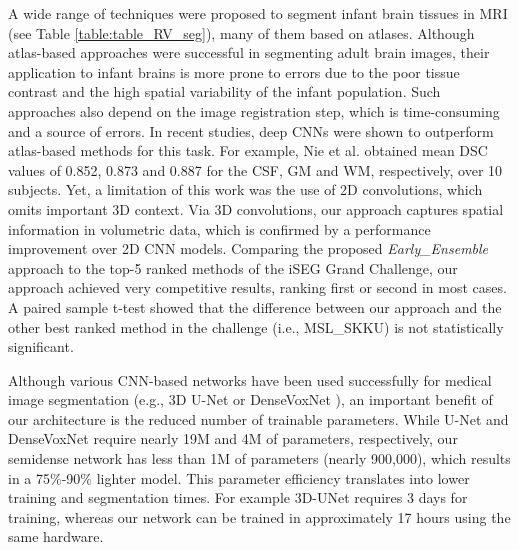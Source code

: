 \documentclass[twoside,espcrc2]{elsarticle}
\begin{document}
A wide range of techniques were proposed to segment infant brain tissues in MRI (see Table \ref{table:table_RV_seg}), many of them based on atlases. Although atlas-based approaches were successful in segmenting adult brain images, their application to infant brains is more prone to errors due to the poor tissue contrast and the high spatial variability of the infant population. Such approaches also depend on the image registration step, which is time-consuming and a source of errors. In recent studies, deep CNNs were shown to outperform atlas-based methods for this task. For example, Nie et al. \cite{nie2016fully} obtained mean DSC values of 0.852, 0.873 and 0.887 for the CSF, GM and WM, respectively, over 10 subjects. Yet, a limitation of this work was the use of 2D convolutions, which omits important 3D context. Via 3D convolutions, our approach captures spatial information in volumetric data, which is confirmed by a performance improvement over 2D CNN models. Comparing the proposed \textit{Early\_Ensemble} approach to the top-5 ranked methods of the iSEG Grand Challenge, our approach achieved very competitive results, ranking first or second in most cases. A paired sample t-test showed that the difference between our approach and the other best ranked method in the challenge (i.e.,  MSL\_SKKU) is not statistically significant.

Although various CNN-based networks have been used successfully for medical image segmentation (e.g., 3D U-Net \cite{cciccek20163d} or DenseVoxNet \cite{yu2017automatic}), an important benefit of our architecture is the reduced number of trainable parameters. While U-Net and DenseVoxNet require nearly 19M and 4M of parameters, respectively, our semidense network has less than 1M of parameters (nearly 900,000), which results in a 75$\%$-90$\%$ lighter model. This parameter efficiency translates into lower training and segmentation times. For example 3D-UNet requires 3 days for training, whereas our network can be trained in approximately 17 hours using the same hardware. 
\end{document}
